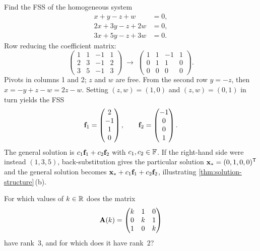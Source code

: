 \begin{example}
\label{ex:fsr}
Find the FSS of the homogeneous system
\[
  \begin{aligned}
    x + y - z + w &= 0, \\
    2x + 3y - z + 2w &= 0, \\
    3x + 5y - z + 3w &= 0.
  \end{aligned}
\]
Row reducing the coefficient matrix:
\[
  \begin{pmatrix}
    1 & 1 & -1 & 1 \\
    2 & 3 & -1 & 2 \\
    3 & 5 & -1 & 3
  \end{pmatrix}
  \;\longrightarrow\;
  \begin{pmatrix}
    1 & 1 & -1 & 1 \\
    0 & 1 & 1 & 0 \\
    0 & 0 & 0 & 0
  \end{pmatrix}.
\]
Pivots in columns 1 and 2; $z$ and $w$ are free. From the second row
$y = -z$, then $x = -y + z - w = 2z - w$. Setting $(z, w) = (1, 0)$
and $(z, w) = (0, 1)$ in turn yields the FSS
\[
  \mathbf{f}_1 = \begin{pmatrix} 2 \\ -1 \\ 1 \\ 0 \end{pmatrix}, \qquad
  \mathbf{f}_2 = \begin{pmatrix} -1 \\ 0 \\ 0 \\ 1 \end{pmatrix}.
\]
The general solution is $c_1 \mathbf{f}_1 + c_2 \mathbf{f}_2$ with
$c_1, c_2 \in \mathbb{F}$. If the right-hand side were instead $(1, 3, 5)$,
back-substitution gives the particular solution $\mathbf{x}_* = (0, 1, 0, 0)^{\mathsf{T}}$
and the general solution becomes $\mathbf{x}_* + c_1 \mathbf{f}_1 + c_2 \mathbf{f}_2$,
illustrating \cref{thm:solution-structure}\,(b).
\end{example}

\begin{problem}
\label{prob:rank-parameter}
For which values of $k \in \mathbb{R}$ does the matrix
\[
  \mathbf{A}(k) = \begin{pmatrix}
    k & 1 & 0 \\
    0 & k & 1 \\
    1 & 0 & k
  \end{pmatrix}
\]
have rank~$3$, and for which does it have rank~$2$?
\end{problem}

